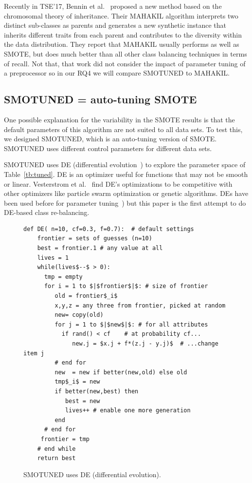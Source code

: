 \documentclass[sigconf,review, anonymous]{acmart}
\theoremstyle{break}
\theoremstyle{break}
\newcommand{\sma}{{\sc SMOTE}}
\newcommand{\smb}{{\sc SMOTUNED}}
\begin{document}
Recently in TSE'17, Bennin et al.~\cite{bennin2017mahakil}  proposed a new method based on the chromosomal theory of inheritance. 
Their MAHAKIL algorithm interprets two distinct sub-classes as parents and generates a new synthetic instance that inherits different traits from each parent and contributes to the diversity within the data distribution.
They report that MAHAKIL usually performs as well as  {\sma}, but
does much better than all   other class balancing techniques in terms of recall.
Not that, that work did not  consider the impact of parameter tuning of a preprocessor so in our RQ4 we will compare {\smb} to MAHAKIL.

\subsection{SMOTUNED = auto-tuning {\sma}}
\label{sect:smotuned}

One possible explanation for the variability in the {\sma} results is that the
default parameters of this algorithm are not suited to all data sets. To test this,
we designed {\smb}, which is an auto-tuning version of {\sma}. {\smb}
uses different control parameters for different data sets.


 
{\smb} uses DE (differential evolution~\cite{storn1997differential}) to explore the parameter space of
Table~\ref{tb:tuned}.  DE is an
optimizer useful for functions that may not be smooth or linear.  Vesterstrom et al.~\cite{vesterstrom2004comparative} find   DE's optimizations to be  competitive with other optimizers like 
   particle swarm optimization or genetic algorithms.
   DEs have been used before for   parameter tuning~\cite{omran2005differential, chiha2012tuning,fu2016tuning,fu2017easy, agrawal2016wrong}) but this paper is  the first attempt to do
   DE-based class re-balancing.

\begin{figure}[!t]
\small 
\begin{lstlisting}[mathescape,linewidth=6.7cm,frame=none,numbers=right ]
  def DE( n=10, cf=0.3, f=0.7):  # default settings
    frontier = sets of guesses (n=10)
    best = frontier.1 # any value at all
    lives = 1
    while(lives$--$ > 0): 
      tmp = empty
      for i = 1 to $|$frontier$|$: # size of frontier
         old = frontier$_i$
         x,y,z = any three from frontier, picked at random
         new= copy(old)  
         for j = 1 to $|$new$|$: # for all attributes
           if rand() < cf    # at probability cf...
              new.j = $x.j + f*(z.j - y.j)$  # ...change item j
         # end for
         new  = new if better(new,old) else old
         tmp$_i$ = new 
         if better(new,best) then
            best = new
            lives++ # enable one more generation
         end                  
      # end for
     frontier = tmp
    # end while
    return best
\end{lstlisting} 
\caption{SMOTUNED uses DE (differential evolution).}
\label{fig:pseudo_DE} 
\vspace{-0.3cm}
\end{figure}
\end{document}
